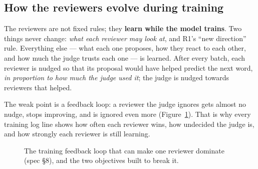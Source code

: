 \documentclass[a4paper,12pt,parskip=half,headsepline]{scrartcl}
\begin{document}
\subsection{How the reviewers evolve during training}

\begin{plain}
The reviewers are not fixed rules; they \textbf{learn while the model trains}. Two
things never change: \emph{what each reviewer may look at}, and R1's ``new
direction'' rule. Everything else --- what each one proposes, how they react to each
other, and how much the judge trusts each one --- is learned. After every batch,
each reviewer is nudged so that its proposal would have helped predict the next word,
\emph{in proportion to how much the judge used it}; the judge is nudged towards
reviewers that helped.

The weak point is a feedback loop: a reviewer the judge ignores gets almost no
nudge, stops improving, and is ignored even more (Figure~\ref{fig:loop}). That is
why every training log line shows how often each reviewer wins, how undecided the
judge is, and how strongly each reviewer is still learning.
\end{plain}

\begin{figure}[H]
\centering
{}
\caption{The training feedback loop that can make one reviewer dominate (spec \S8), and the two objectives built to break it.}
\label{fig:loop}
\end{figure}
\end{document}

